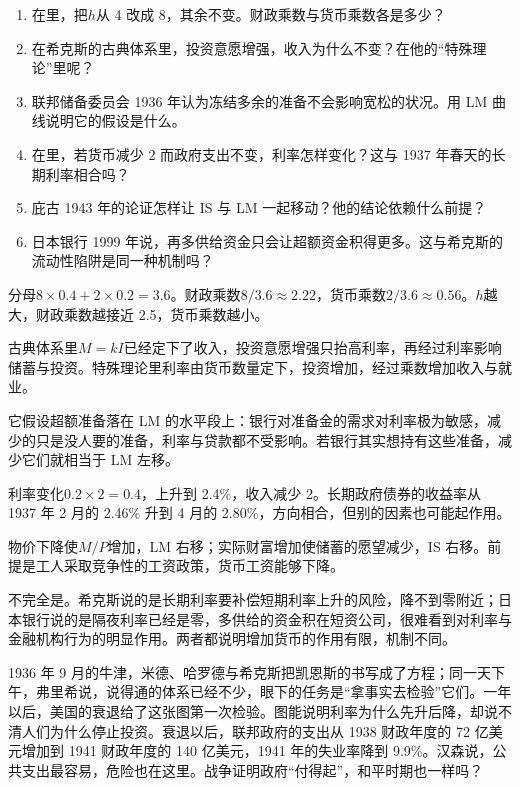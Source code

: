 \begin{selfcheck}
\begin{enumerate}
\item 在里，把$h$从 4 改成 8，其余不变。财政乘数与货币乘数各是多少？
\item 在希克斯的古典体系里，投资意愿增强，收入为什么不变？在他的“特殊理论”里呢？
\item 联邦储备委员会 1936 年认为冻结多余的准备不会影响宽松的状况。用 LM 曲线说明它的假设是什么。
\item 在里，若货币减少 2 而政府支出不变，利率怎样变化？这与 1937 年春天的长期利率相合吗？
\item 庇古 1943 年的论证怎样让 IS 与 LM 一起移动？他的结论依赖什么前提？
\item 日本银行 1999 年说，再多供给资金只会让超额资金积得更多。这与希克斯的流动性陷阱是同一种机制吗？
\end{enumerate}
\end{selfcheck}

\begin{answers}
\item 分母$8\times0.4+2\times0.2=3.6$。财政乘数$8/3.6\approx2.22$，货币乘数$2/3.6\approx0.56$。$h$越大，财政乘数越接近 2.5，货币乘数越小。
\item 古典体系里$M=kI$已经定下了收入，投资意愿增强只抬高利率，再经过利率影响储蓄与投资。特殊理论里利率由货币数量定下，投资增加，经过乘数增加收入与就业。
\item 它假设超额准备落在 LM 的水平段上：银行对准备金的需求对利率极为敏感，减少的只是没人要的准备，利率与贷款都不受影响。若银行其实想持有这些准备，减少它们就相当于 LM 左移。
\item 利率变化$0.2\times2=0.4$，上升到 2.4\%，收入减少 2。长期政府债券的收益率从 1937 年 2 月的 2.46\% 升到 4 月的 2.80\%，方向相合，但别的因素也可能起作用。
\item 物价下降使$M/P$增加，LM 右移；实际财富增加使储蓄的愿望减少，IS 右移。前提是工人采取竞争性的工资政策，货币工资能够下降。
\item 不完全是。希克斯说的是长期利率要补偿短期利率上升的风险，降不到零附近；日本银行说的是隔夜利率已经是零，多供给的资金积在短资公司，很难看到对利率与金融机构行为的明显作用。两者都说明增加货币的作用有限，机制不同。
\end{answers}

1936 年 9 月的牛津，米德、哈罗德与希克斯把凯恩斯的书写成了方程；同一天下午，弗里希说，说得通的体系已经不少，眼下的任务是“拿事实去检验”它们\cite{oxford1937}。一年以后，美国的衰退给了这张图第一次检验。图能说明利率为什么先升后降，却说不清人们为什么停止投资。衰退以后，联邦政府的支出从 1938 财政年度的 72 亿美元增加到 1941 财政年度的 140 亿美元，1941 年的失业率降到 9.9\%\cite{census1975y,census1975a}。汉森说，公共支出最容易，危险也在这里。战争证明政府“付得起”，和平时期也一样吗？
